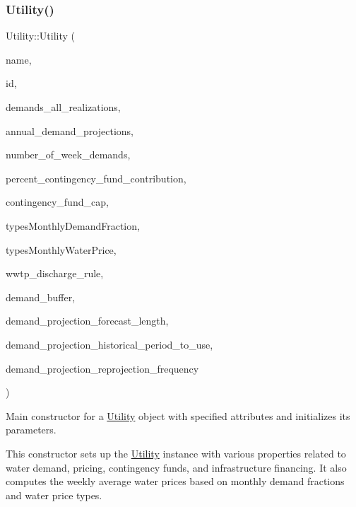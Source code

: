 \subsubsection{\texorpdfstring{Utility()}{Utility()}\hspace{0.1cm}{\footnotesize\ttfamily [1/4]}}
{\footnotesize\ttfamily Utility\+::\+Utility (\begin{DoxyParamCaption}\item[{const char $\ast$}]{name,  }\item[{int}]{id,  }\item[{vector$<$ vector$<$ double $>$$>$ \&}]{demands\+\_\+all\+\_\+realizations,  }\item[{vector$<$ double $>$ \&}]{annual\+\_\+demand\+\_\+projections,  }\item[{int}]{number\+\_\+of\+\_\+week\+\_\+demands,  }\item[{const double}]{percent\+\_\+contingency\+\_\+fund\+\_\+contribution,  }\item[{const double}]{contingency\+\_\+fund\+\_\+cap,  }\item[{const vector$<$ vector$<$ double $>$$>$ \&}]{types\+Monthly\+Demand\+Fraction,  }\item[{const vector$<$ vector$<$ double $>$$>$ \&}]{types\+Monthly\+Water\+Price,  }\item[{Wwtp\+Discharge\+Rule}]{wwtp\+\_\+discharge\+\_\+rule,  }\item[{double}]{demand\+\_\+buffer,  }\item[{int}]{demand\+\_\+projection\+\_\+forecast\+\_\+length,  }\item[{int}]{demand\+\_\+projection\+\_\+historical\+\_\+period\+\_\+to\+\_\+use,  }\item[{int}]{demand\+\_\+projection\+\_\+reprojection\+\_\+frequency }\end{DoxyParamCaption})}



Main constructor for a \mbox{\hyperlink{classUtility}{Utility}} object with specified attributes and initializes its parameters. 

This constructor sets up the \mbox{\hyperlink{classUtility}{Utility}} instance with various properties related to water demand, pricing, contingency funds, and infrastructure financing. It also computes the weekly average water prices based on monthly demand fractions and water price types.


